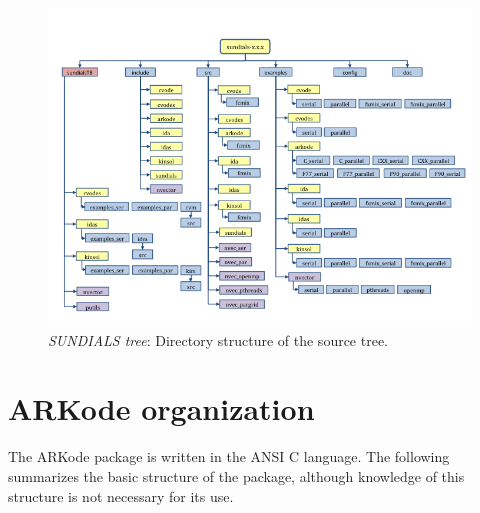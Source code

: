 \documentclass[letterpaper,10pt,english]{sphinxmanual}
\begin{document}
\begin{figure}[htbp]
\centering
\capstart

\includegraphics{sunorg2.png}
\caption{\emph{SUNDIALS tree}: Directory structure of the source tree.}\label{Organization:sunorg2}\end{figure}


\section{ARKode organization}
\label{Organization:arkode-organization}
The ARKode package is written in the ANSI C language.  The
following summarizes the basic structure of the package, although
knowledge of this structure is not necessary for its use.
\end{document}
